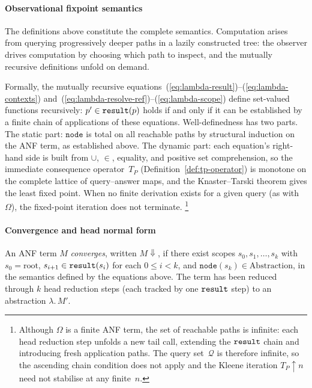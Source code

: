 \paragraph{Observational fixpoint semantics}
The definitions above constitute the complete semantics.
Computation arises from querying progressively deeper paths
in a lazily constructed tree: the observer drives computation
by choosing which path to inspect, and the mutually recursive
definitions unfold on demand.

Formally, the mutually recursive
equations~(\ref{eq:lambda-result})--(\ref{eq:lambda-contexts})
and~(\ref{eq:lambda-resolve-ref})--(\ref{eq:lambda-scope})
define set-valued functions recursively:
$p' \in \mathtt{result}(p)$ holds if and only if it can be
established by a finite chain of applications of these
equations.
Well-definedness has two parts.
The static part: $\mathtt{node}$ is total on all
reachable paths by structural induction on the ANF term,
as established above.
The dynamic part: each equation's right-hand side is
built from $\cup$, $\in$, equality, and positive set
comprehension, so the immediate consequence
operator~$T_P$ (Definition~\ref{def:tp-operator}) is
monotone on the complete lattice of query--answer maps,
and the Knaster--Tarski theorem gives the least fixed
point.
When no finite derivation exists for a given query
(as with $\Omega$), the fixed-point iteration does not
terminate.%
\footnote{
  Although $\Omega$ is a finite ANF term, the set of
  reachable paths is infinite: each head reduction step
  unfolds a new tail call, extending the $\mathtt{result}$ chain
  and introducing fresh application paths.
  The query set~$\mathcal{Q}$ is therefore infinite, so
  the ascending chain condition does not apply and the
  Kleene iteration $T_P\!\uparrow\!n$ need not stabilise
  at any finite~$n$.
}

\paragraph{Convergence and head normal form}
An ANF term $M$ \emph{converges}, written $M{\Downarrow}$,
if there exist scopes $s_0, s_1, \ldots, s_k$
with $s_0 = \text{root}$,
$s_{i+1} \in \mathtt{result}(s_i)$ for each $0 \le i < k$,
and $\mathtt{node}(s_k) \in \mathrm{Abstraction}$,
in the semantics defined by the equations above.
The term has been reduced through $k$ head reduction steps
(each tracked by one $\mathtt{result}$ step) to an abstraction
$\lambda.\,M'$.

